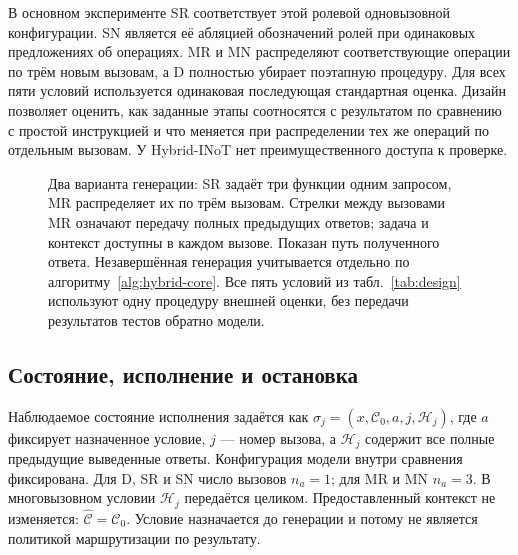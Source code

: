 В основном эксперименте SR соответствует этой ролевой одновызовной конфигурации. SN является её абляцией обозначений ролей при одинаковых предложениях об операциях. MR и MN распределяют соответствующие операции по трём новым вызовам, а D полностью убирает поэтапную процедуру. Для всех пяти условий используется одинаковая последующая стандартная оценка. Дизайн позволяет оценить, как заданные этапы соотносятся с результатом по сравнению с простой инструкцией и что меняется при распределении тех же операций по отдельным вызовам. У Hybrid-INoT нет преимущественного доступа к проверке.

\begin{figure}[htbp]\centering

\caption{Два варианта генерации: SR задаёт три функции одним запросом, MR распределяет их по трём вызовам. Стрелки между вызовами MR означают передачу полных предыдущих ответов; задача и контекст доступны в каждом вызове. Показан путь полученного ответа. Незавершённая генерация учитывается отдельно по алгоритму~\ref{alg:hybrid-core}. Все пять условий из табл.~\ref{tab:design} используют одну процедуру внешней оценки, без передачи результатов тестов обратно модели.}
\label{fig:hybrid-core}
\end{figure}
\FloatBarrier

\subsection{Состояние, исполнение и остановка}
Наблюдаемое состояние исполнения задаётся как $\sigma_j=(x,\mathcal{C}_0,a,j,\mathcal{H}_j)$, где $a$ фиксирует назначенное условие, $j$ --- номер вызова, а $\mathcal{H}_j$ содержит все полные предыдущие выведенные ответы. Конфигурация модели внутри сравнения фиксирована. Для D, SR и SN число вызовов $n_a=1$; для MR и MN $n_a=3$. В многовызовном условии $\mathcal{H}_j$ передаётся целиком. Предоставленный контекст не изменяется: $\widehat{\mathcal{C}}=\mathcal{C}_0$. Условие назначается до генерации и потому не является политикой маршрутизации по результату.

